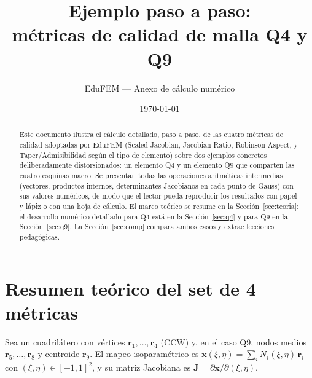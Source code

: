 \documentclass[11pt,a4paper]{article}
\title{\bfseries Ejemplo paso a paso:\\m\'etricas de calidad de malla Q4 y Q9}
\author{EduFEM --- Anexo de c\'alculo num\'erico}
\date{\today}
\begin{document}
\maketitle

\begin{abstract}
\noindent
Este documento ilustra el c\'alculo detallado, paso a paso, de las cuatro m\'etricas de calidad adoptadas por EduFEM (Scaled Jacobian, Jacobian Ratio, Robinson Aspect, y Taper/Admisibilidad seg\'un el tipo de elemento) sobre dos ejemplos concretos deliberadamente distorsionados: un elemento Q4 y un elemento Q9 que comparten las cuatro esquinas macro. Se presentan todas las operaciones aritm\'eticas intermedias (vectores, productos internos, determinantes Jacobianos en cada punto de Gauss) con sus valores num\'ericos, de modo que el lector pueda reproducir los resultados con papel y l\'apiz o con una hoja de c\'alculo. El marco te\'orico se resume en la Secci\'on~\ref{sec:teoria}; el desarrollo num\'erico detallado para Q4 est\'a en la Secci\'on~\ref{sec:q4} y para Q9 en la Secci\'on~\ref{sec:q9}. La Secci\'on~\ref{sec:comp} compara ambos casos y extrae lecciones pedag\'ogicas.
\end{abstract}

\tableofcontents
\vspace{1em}

\section{Resumen te\'orico del set de 4 m\'etricas}
\label{sec:teoria}

Sea un cuadril\'atero con v\'ertices $\mathbf{r}_1,\ldots,\mathbf{r}_4$ (CCW) y, en el caso Q9, nodos medios $\mathbf{r}_5,\ldots,\mathbf{r}_8$ y centroide $\mathbf{r}_9$. El mapeo isoparam\'etrico es $\mathbf{x}(\xi,\eta) = \sum_i N_i(\xi,\eta)\,\mathbf{r}_i$ con $(\xi,\eta)\in[-1,1]^2$, y su matriz Jacobiana es $\mathbf{J} = \partial\mathbf{x}/\partial(\xi,\eta)$.
\end{document}
